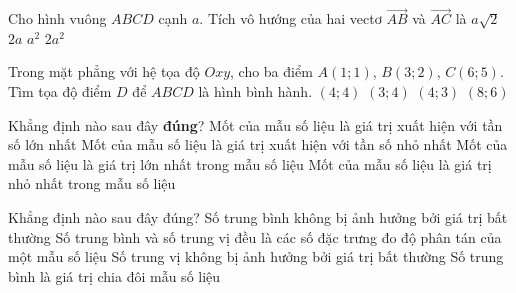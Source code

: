 \begin{ex}%
	Cho hình vuông $ABCD$ cạnh $a$. Tích vô hướng của hai vectơ $\overrightarrow{AB}$ và $\overrightarrow{AC}$ là
	\choice
	{$a\sqrt{2}$}
	{$2a$}
	{\True $a^2$}
	{$2a^2$}
\end{ex}

\begin{ex}%
	Trong mặt phẳng với hệ tọa độ $Oxy$, cho ba điểm $A(1;1)$, $B(3;2)$, $C(6;5)$. Tìm tọa độ điểm $D$ để $ABCD$ là hình bình hành.
	\choice
	{\True $(4;4)$}
	{$(3;4)$}
	{$(4;3)$}
	{$(8;6)$}
\end{ex}

\begin{ex}%
	Khẳng định nào sau đây \textbf{đúng}?
	\choice
	{\True Mốt của mẫu số liệu là giá trị xuất hiện với tần số lớn nhất}
	{Mốt của mẫu số liệu là giá trị xuất hiện với tần số nhỏ nhất}
	{Mốt của mẫu số liệu là giá trị lớn nhất trong mẫu số liệu}
	{Mốt của mẫu số liệu là giá trị nhỏ nhất trong mẫu số liệu}
\end{ex}

\begin{ex}%
	Khẳng định nào sau đây đúng?
	\choice
	{Số trung bình không bị ảnh hưởng bởi giá trị bất thường}
	{Số trung bình và số trung vị đều là các số đặc trưng đo độ phân tán của một mẫu số liệu}
	{\True Số trung vị không bị ảnh hưởng bởi giá trị bất thường}
	{Số trung bình là giá trị chia đôi mẫu số liệu}
\end{ex}

